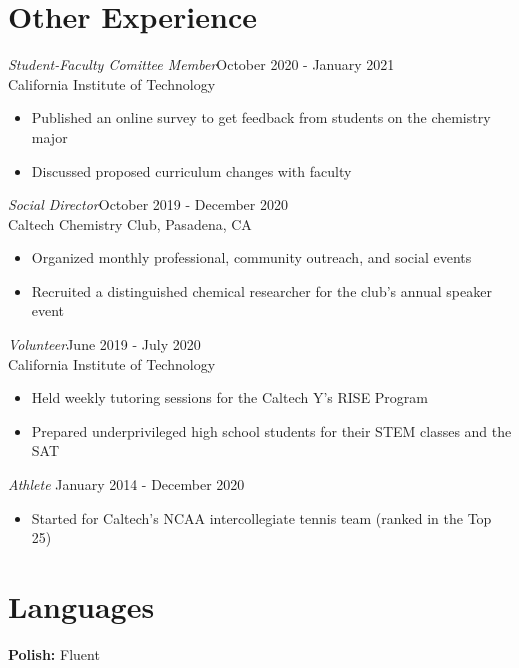 \documentclass[margin,line]{resume}
\begin{document}
\begin{resume}
\section{\mysidestyle Other Experience}
{\sl Student-Faculty Comittee Member}\hfill October 2020 - January 2021\\
California Institute of Technology
\begin{itemize}
\item Published an online survey to get feedback from students on the chemistry major
\item Discussed proposed curriculum changes with faculty
\end{itemize}
{\sl Social Director}\hfill October 2019 - December 2020\\
Caltech Chemistry Club, Pasadena, CA
\begin{itemize}
\item Organized monthly professional, community outreach, and social events
\item Recruited a distinguished chemical researcher for the club's annual speaker event
\end{itemize}
{\sl Volunteer}\hfill June 2019 - July 2020\\
California Institute of Technology
\begin{itemize}
\item Held weekly tutoring sessions for the Caltech Y's RISE Program
\item Prepared underprivileged high school students for their STEM classes and the SAT
\end{itemize}
{\sl Athlete} \hfill January 2014 - December 2020
\begin{itemize}
\item Started for Caltech's NCAA intercollegiate tennis team (ranked in the Top 25)
\end{itemize}

\section{\mysidestyle Languages}
\textbf{Polish: }\textnormal{Fluent}


\end{resume}   
\end{document}
